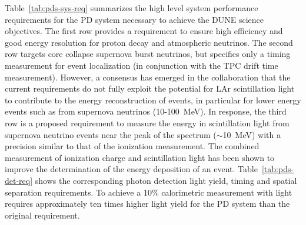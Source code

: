 

Table~\ref{tab:pds-sys-req} summarizes the high level system performance requirements for the PD system necessary to achieve the DUNE science objectives. The first row provides a requirement to ensure high efficiency and good energy resolution for proton decay and atmospheric neutrinos.  The second row targets core collapse supernova burst neutrinos, but specifies only a timing measurement for event localization (in conjunction with the TPC drift time measurement). 
However, a consensus has emerged in the collaboration that the current requirements do not fully exploit the potential  for LAr scintillation light to contribute to the energy reconstruction of events, in particular for lower energy events such as from supernova neutrinos (\num{10}-\SI{100}{MeV}). In response, the third row is a proposed requirement to measure the energy in scintillation light from supernova neutrino events near the peak of the spectrum ($\sim$\SI{10}{MeV}) with a precision similar to that of the ionization measurement. The combined measurement of ionization charge and scintillation light has been shown to improve the determination of the energy deposition of an event. 
Table~\ref{tab:pds-det-req} shows the corresponding photon detection light yield, timing and spatial separation requirements. To achieve a 10\%  calorimetric measurement with light requires approximately ten times higher light yield for the PD system than the original requirement. 

